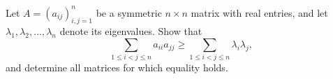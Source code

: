 \documentclass{article}
\begin{document}
\setlength{\parindent}{0pt}
Let $A = \left(a_{ij}\right)^n_{i,j=1}$ be a symmetric $n \times n$ matrix with real entries, and let $\lambda_1, \lambda_2, \ldots, \lambda_n$ denote its eigenvalues. Show that
\[\sum_{1 \leq i < j \leq n} a_{ii}a_{jj} \geq \sum_{1 \leq i < j \leq n} \lambda_i\lambda_j ,\]
and determine all matrices for which equality holds.
\end{document}
